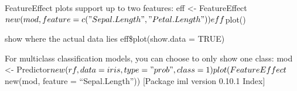 \documentclass[
  ignorenonframetext,
]{beamer}
\begin{document}
\begin{frame}{FeatureEffect plots support up to two features:}
\protect\hypertarget{featureeffect-plots-support-up-to-two-features}{}
eff \textless-
FeatureEffect\(new(mod, feature = c("Sepal.Length", "Petal.Length")) eff\)plot()
\end{frame}

\begin{frame}{show where the actual data lies}
\protect\hypertarget{show-where-the-actual-data-lies}{}
eff\$plot(show.data = TRUE)
\end{frame}

\begin{frame}{For multiclass classification models, you can choose to
only show one class:}
\protect\hypertarget{for-multiclass-classification-models-you-can-choose-to-only-show-one-class}{}
mod \textless-
Predictor\(new(rf, data = iris, type = "prob", class = 1) plot(FeatureEffect\)new(mod,
feature = ``Sepal.Length'')) {[}Package iml version 0.10.1 Index{]}
\end{frame}
\end{document}
